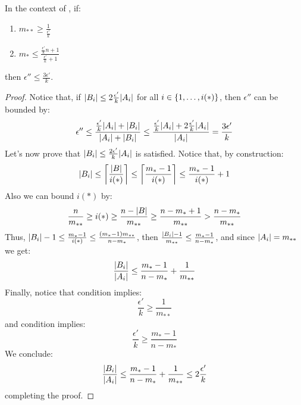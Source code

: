        \begin{remark}[Remark 5.14.3] \label{rmk:epsilons_proportion_can_be_k}
            In the context of , if:
            \begin{enumerate}[label=(\alph*), ref=\alph*]
                \item \label{itm:epsilons_proportion_can_be_k.a} $m_{**} \geq \frac{1}{\frac{\epsilon'}{k}}$
                \item \label{itm:epsilons_proportion_can_be_k.b} $m_* \leq \frac{\frac{\epsilon'}{k} n + 1}{\frac{\epsilon'}{k} + 1}$
            \end{enumerate}
            then $\epsilon'' \leq \frac{3 \epsilon'}{k}$.
            \begin{proof}
                Notice that, if $| B_i | \leq 2 \frac{\epsilon'}{k} | A_i |$ for all $i \in \{ 1, \dots, i(*) \}$,
                then $\epsilon''$ can be bounded by:
                \[
                    \epsilon'' \leq \frac{\frac{\epsilon'}{k} | A_i | + | B_i |}{| A_i | + | B_i |}
                    \leq \frac{\frac{\epsilon'}{k} | A_i | + 2 \frac{\epsilon'}{k} | A_i |}{| A_i |}
                    = \frac{3 \epsilon'}{k}
                \]
                Let's now prove that $| B_i | \leq \frac{2 \epsilon'}{k} | A_i |$ is satisfied.
                Notice that, by construction:
                \[
                    | B_i | \leq \left\lceil \frac{| B |}{i(*)} \right\rceil \leq \left\lceil \frac{m_* - 1}{i(*)} \right\rceil \leq
                    \frac{m_* - 1}{i(*)} + 1
                \]
                Also we can bound $i(*)$ by:
                \[
                    \frac{n}{m_{**}} \geq i(*) \geq \frac{n - | B |}{m_{**}} \geq \frac{n - m_* + 1}{m_{**}} >
                    \frac{n - m_*}{m_{**}}
                \]
                Thus, $| B_i | - 1 \leq \frac{m_* - 1}{i(*)} \leq \frac{( m_* - 1 ) m_{**}}{n - m_*}$,
                then $\frac{| B_i | - 1}{m_{**}} \leq \frac{m_* - 1}{n - m_*}$, and since $| A_i | = m_{**}$
                we get:
                \[
                    \frac{| B_i |}{| A_i |} \leq \frac{m_* - 1}{n - m_*} + \frac{1}{m_{**}}
                \]
                Finally, notice that condition  implies:
                \[
                    \frac{\epsilon'}{k} \geq \frac{1}{m_{**}}
                \]
                and condition  implies:
                \[
                    \frac{\epsilon'}{k} \geq \frac{m_* - 1}{n - m_*}
                \]
                We conclude:
                \[
                    \frac{| B_i |}{| A_i |} \leq \frac{m_* - 1}{n - m_*} + \frac{1}{m_{**}} \leq 2 \frac{\epsilon'}{k}
                \]
                completing the proof.
            \end{proof}
        \end{remark}

